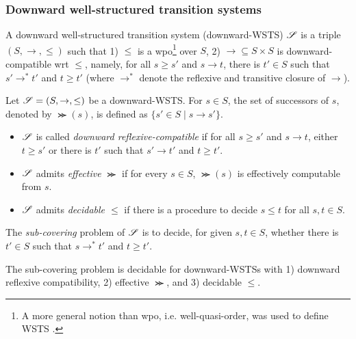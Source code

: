 
\subsubsection{Downward well-structured transition systems}

\begin{definition}
A downward well-structured transition system (downward-WSTS) $\mathscr{S}$ is a triple $(S, \rightarrow, \le)$ such that 1) $\le$ is a wpo\footnote{A more general notion than wpo, i.e. well-quasi-order, was used to define WSTS \cite{FS01}. } over $S$, 2) $\rightarrow \subseteq S \times S$ is downward-compatible wrt $\le$, namely, for all $s \ge s'$ and $s \rightarrow t$, there is $t' \in S$ such that $s' \rightarrow^* t'$ and $t \ge t'$ (where $ \rightarrow^*$ denote the reflexive and transitive closure of $\rightarrow$).
\end{definition}


Let $\mathscr{S} = (S, \rightarrow, \le)$ be a downward-WSTS. For $s \in S$, the set of successors of $s$, denoted by $\Succ(s)$, is defined as $\{s' \in S \mid s \rightarrow s'\}$.
\begin{itemize}
\item $\mathscr{S}$ is called \emph{downward reflexive-compatible} if for all $s \ge s'$ and $s \rightarrow t$, either $t \ge s'$ or there is $t'$ such that $s' \rightarrow t'$ and $t \ge t'$.
%
\item $\mathscr{S}$ admits \emph{effective} $\Succ$ if for every $s \in S$, $\Succ(s)$ is effectively computable from $s$.
%
\item $\mathscr{S}$ admits \emph{decidable $\le$} if there is a procedure to decide $s \le t$ for all $s, t \in S$.
%
\end{itemize}

The \emph{sub-covering} problem of $\mathscr{S}$ is to decide, for given $s, t \in S$, whether %
there is $t' \in S$ such that $s \rightarrow^* t'$ and $t \ge t'$.

\begin{theorem}\label{thm-dwsts}
The sub-covering problem is decidable for downward-WSTSs with 1) downward reflexive compatibility,  2) effective $\Succ$, and 3) decidable $\le$.
\end{theorem}



